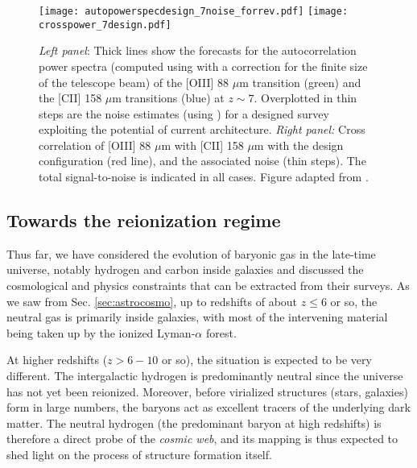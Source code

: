 


\begin{figure}
\begin{center}
\texttt{[image: autopowerspecdesign\_7noise\_forrev.pdf]} \texttt{[image: crosspower\_7design.pdf]}
\caption{\textit{Left panel}: Thick lines show the forecasts for the autocorrelation power spectra (computed using  with a correction for the finite size of the telescope beam) of the [OIII]  88 $\mu$m transition (green) and the [CII] 158 $\mu$m transitions (blue) at $z \sim 7$. Overplotted in thin steps are the noise estimates (using ) for a designed survey exploiting the potential of current architecture. \textit{Right panel:} Cross correlation of [OIII] 88 $\mu$m with [CII] 158 $\mu$m with the design configuration (red line), and the associated noise (thin steps). The total signal-to-noise is indicated in all cases. Figure adapted from \cite{hpoiii}.}
\label{fig:oiii}
\end{center}
\end{figure}


\subsection{Towards the reionization regime}
\label{s:estimator}

Thus far, we have considered the evolution of baryonic gas in the late-time universe, notably hydrogen and carbon inside galaxies and discussed the cosmological and physics constraints that can be extracted from their surveys. As we saw from Sec. \ref{sec:astrocosmo}, up to redshifts of about $z \leq 6$ or so, the neutral gas is primarily inside galaxies, with most of the intervening material being taken up by the ionized Lyman-$\alpha$ forest.

At higher redshifts ($z > 6-10$ or so), the situation is expected to be very different. The intergalactic hydrogen is predominantly neutral since the universe has not yet been reionized. Moreover, before virialized structures (stars, galaxies) form in large numbers, the baryons act as excellent tracers of the underlying dark matter.  The neutral hydrogen (the predominant baryon at high redshifts) is therefore a direct probe of the \textit{cosmic web}, and its mapping is thus expected to shed light on the process of structure formation itself. 


